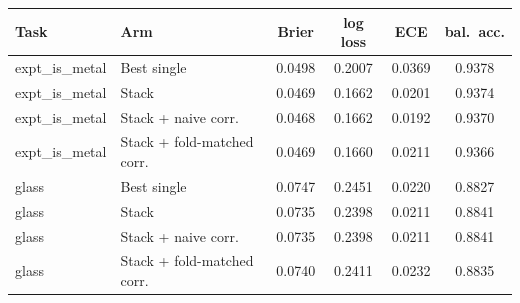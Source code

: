\begin{tabular}{llcccc}
\toprule
Task & Arm & Brier & log loss & ECE & bal.\ acc. \\
\midrule
expt\_is\_metal & Best single & 0.0498 & 0.2007 & 0.0369 & 0.9378 \\
expt\_is\_metal & Stack & 0.0469 & 0.1662 & 0.0201 & 0.9374 \\
expt\_is\_metal & Stack + naive corr. & 0.0468 & 0.1662 & 0.0192 & 0.9370 \\
expt\_is\_metal & Stack + fold-matched corr. & 0.0469 & 0.1660 & 0.0211 & 0.9366 \\
glass & Best single & 0.0747 & 0.2451 & 0.0220 & 0.8827 \\
glass & Stack & 0.0735 & 0.2398 & 0.0211 & 0.8841 \\
glass & Stack + naive corr. & 0.0735 & 0.2398 & 0.0211 & 0.8841 \\
glass & Stack + fold-matched corr. & 0.0740 & 0.2411 & 0.0232 & 0.8835 \\
\bottomrule
\end{tabular}
